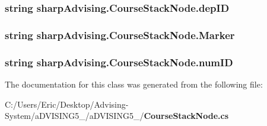 \subsubsection[{dep\+I\+D}]{\setlength{\rightskip}{0pt plus 5cm}string sharp\+Advising.\+Course\+Stack\+Node.\+dep\+I\+D}\label{classsharp_advising_1_1_course_stack_node_a9327e837d316a384e89a9c42c104116f}
\subsubsection[{Marker}]{\setlength{\rightskip}{0pt plus 5cm}string sharp\+Advising.\+Course\+Stack\+Node.\+Marker}\label{classsharp_advising_1_1_course_stack_node_ad7bfbfee25ba46428a9edfa1ef643e28}
\subsubsection[{num\+I\+D}]{\setlength{\rightskip}{0pt plus 5cm}string sharp\+Advising.\+Course\+Stack\+Node.\+num\+I\+D}\label{classsharp_advising_1_1_course_stack_node_a04c5422f3e2c3cec10b6d46a1ce1f2d2}


The documentation for this class was generated from the following file\+:\begin{DoxyCompactItemize}
\item 
C\+:/\+Users/\+Eric/\+Desktop/\+Advising-\/\+System/a\+D\+V\+I\+S\+I\+N\+G5\+\_/a\+D\+V\+I\+S\+I\+N\+G5\+\_/{\bf Course\+Stack\+Node.\+cs}\end{DoxyCompactItemize}
